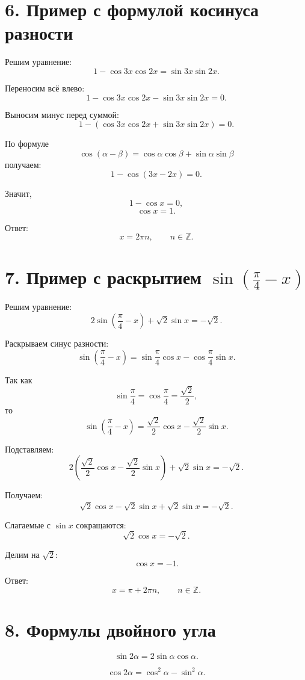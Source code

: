 \documentclass[a4paper,12pt]{article}
\newcommand{\Z}{\mathbb{Z}}
\begin{document}
\section*{6. Пример с формулой косинуса разности}

Решим уравнение:
\[
    1-\cos 3x\cos 2x=\sin 3x\sin 2x.
\]

Переносим всё влево:
\[
    1-\cos 3x\cos 2x-\sin 3x\sin 2x=0.
\]

Выносим минус перед суммой:
\[
    1-(\cos 3x\cos 2x+\sin 3x\sin 2x)=0.
\]

По формуле
\[
    \cos(\alpha-\beta)=\cos\alpha\cos\beta+\sin\alpha\sin\beta
\]
получаем:
\[
    1-\cos(3x-2x)=0.
\]

Значит,
\[
    1-\cos x=0,
\]
\[
    \cos x=1.
\]

Ответ:
\[
    \boxed{x=2\pi n,\qquad n\in\Z.}
\]

\section*{7. Пример с раскрытием \(\sin\left(\frac{\pi}{4}-x\right)\)}

Решим уравнение:
\[
    2\sin\left(\frac{\pi}{4}-x\right)+\sqrt2\sin x=-\sqrt2.
\]

Раскрываем синус разности:
\[
    \sin\left(\frac{\pi}{4}-x\right)
    =
    \sin\frac{\pi}{4}\cos x-\cos\frac{\pi}{4}\sin x.
\]

Так как
\[
    \sin\frac{\pi}{4}=\cos\frac{\pi}{4}=\frac{\sqrt2}{2},
\]
то
\[
    \sin\left(\frac{\pi}{4}-x\right)
    =
    \frac{\sqrt2}{2}\cos x-\frac{\sqrt2}{2}\sin x.
\]

Подставляем:
\[
    2\left(\frac{\sqrt2}{2}\cos x-\frac{\sqrt2}{2}\sin x\right)+\sqrt2\sin x=-\sqrt2.
\]

Получаем:
\[
    \sqrt2\cos x-\sqrt2\sin x+\sqrt2\sin x=-\sqrt2.
\]

Слагаемые с \(\sin x\) сокращаются:
\[
    \sqrt2\cos x=-\sqrt2.
\]

Делим на \(\sqrt2\):
\[
    \cos x=-1.
\]

Ответ:
\[
    \boxed{x=\pi+2\pi n,\qquad n\in\Z.}
\]

\section*{8. Формулы двойного угла}

\[
    \sin 2\alpha=2\sin\alpha\cos\alpha.
\]

\[
    \cos 2\alpha=\cos^2\alpha-\sin^2\alpha.
\]
\end{document}
